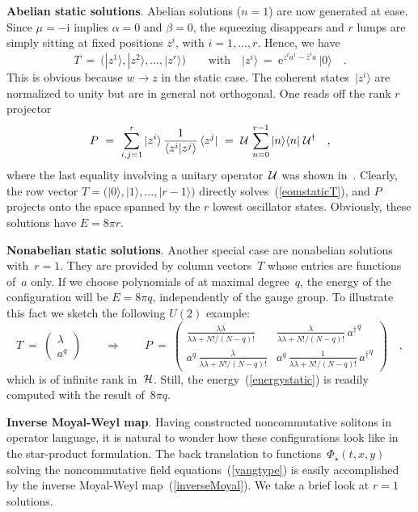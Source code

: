 \documentclass[a4paper,11pt]{article}
\numberwithin{equation}{section}
\def\a{\alpha}
\def\b{\beta}
\def\l{\lambda}
\newcommand{\Hcal}{{\cal H}}
\def\e{\mbox{e}}
\def\i{\mbox{i}}
\newcommand{\adag}{a^{\dagger}}
\newcommand{\lb}{\overline{\lambda}}
\newcommand{\zb}{\overline{z}}
\begin{document}
\noindent
{\bf Abelian static solutions}.
Abelian solutions ($n{=}1$) are now generated at ease.
Since $\mu=-\i$ implies $\a{=}0$ and $\b{=}0$,
the squeezing disappears and $r$ lumps are simply sitting at fixed positions
$z^i$, with $i{=}1,\ldots,r$. Hence, we have
\begin{equation}
T\ =\ \bigl(|z^1\rangle,|z^2\rangle,\ldots,|z^r\rangle\bigr)
\qquad\textrm{with}\quad
|z^i\rangle\ =\ \e^{z^i\adag-\zb^i a}\,|0\rangle \quad.
\end{equation}
This is obvious because $w\to z$ in the static case.
The coherent states~$|z^i\rangle$ are normalized to unity but are in general
not orthogonal.  One reads off the rank $r$ projector
\begin{equation}
P\ =\ \sum_{i,j=1}^r|z^i\rangle\,\frac{1}{\langle z^i|z^j\rangle}\,\langle z^j|
 \ =\ {\cal U}\,\sum_{n=0}^{r-1} |n\rangle\langle n|\;{\cal U}^\dagger \quad,
\end{equation}
where the last equality involving a unitary operator~$\cal{U}$
was shown in~\cite{rocek}.
Clearly, the row vector
$T=\bigl(|0\rangle,|1\rangle,\ldots,|r{-}1\rangle\bigr)$
directly solves~(\ref{eomstaticT}),
and $P$ projects onto the space spanned by the $r$ lowest oscillator states.
Obviously, these solutions have $E=8\pi r$.

\noindent
{\bf Nonabelian static solutions}.
Another special case are nonabelian solutions with~$r{=}1$.
They are provided by column vectors~$T$ whose entries are functions
of~$a$ only.  If we choose polynomials of at maximal degree~$q$,
the energy of the configuration will be $E=8\pi q$, independently of
the gauge group.
To illustrate this fact we sketch the following $U(2)$ example:
\begin{equation} \label{u2ex}
T\ =\ \left(\begin{matrix} \l \\[10pt] a^q \end{matrix}\right)
\qquad\Longrightarrow\qquad
P\ =\  \left(\begin{matrix}
\frac{\l\lb}{\l\lb+N!/(N-q)!} & \frac{\l}{\l\lb+N!/(N-q)!}\,{\adag}^q \\[10pt]
a^q\,\frac{\lb}{\l\lb+N!/(N-q)!} & a^q\,\frac{1}{\l\lb+N!/(N-q)!}\,{\adag}^q
\end{matrix}\right) \quad,
\end{equation}
which is of infinite rank in~$\Hcal$. Still, the energy~(\ref{energystatic})
is readily computed with the result of~$8\pi q$.

\noindent
{\bf Inverse Moyal-Weyl map}.
Having constructed noncommutative solitons in operator language,
it is natural to wonder how these configurations look like in the
star-product formulation.
The back translation to functions~$\Phi_\star(t,x,y)$ solving the
noncommutative field equations~(\ref{yangtype}) is easily accomplished
by the inverse Moyal-Weyl map~(\ref{inverseMoyal}).
We take a brief look at $r{=}1$ solutions.
\end{document}
